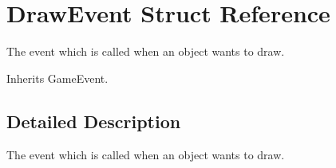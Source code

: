 \hypertarget{struct_draw_event}{\section{Draw\-Event Struct Reference}
\label{struct_draw_event}
}


The event which is called when an object wants to draw.  




Inherits Game\-Event.



\subsection{Detailed Description}
The event which is called when an object wants to draw. 

